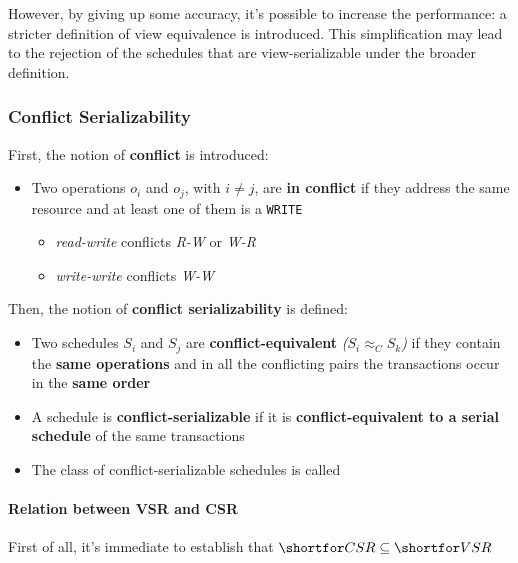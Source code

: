\documentclass[english]{article}
\begin{document}
However, by giving up some accuracy, it's possible to increase the performance: a stricter definition of view equivalence is introduced.
This simplification may lead to the rejection of the schedules that are view-serializable under the broader definition.

\subsubsection{Conflict Serializability}

First, the notion of \textbf{conflict} is introduced:

\begin{itemize}
  \item Two operations \(o_i\) and \(o_j\), with \(i \neq j\), are \textbf{in conflict} if they address the same resource and at least one of them is a \texttt{WRITE}
        \begin{itemize}
          \item \textit{read-write} conflicts \textit{R-W} or \textit{W-R}
          \item \textit{write-write} conflicts \textit{W-W}
        \end{itemize}
\end{itemize}

Then, the notion of \textbf{conflict serializability} is defined:

\begin{itemize}
  \item Two schedules \(S_i\) and \(S_j\) are \textbf{conflict-equivalent} \textit{(\(S_i \approx_C S_k\))} if they contain the \textbf{same operations} and in all the conflicting pairs the transactions occur in the \textbf{same order}
  \item A schedule is \textbf{conflict-serializable} if it is \textbf{conflict-equivalent to a serial schedule} of the same transactions
  \item The class of conflict-serializable schedules is called \textbf{\csr}
\end{itemize}

\paragraph{Relation between VSR and CSR}

First of all, it's immediate to establish that \(\csr \subseteq \vsr\)
\end{document}
